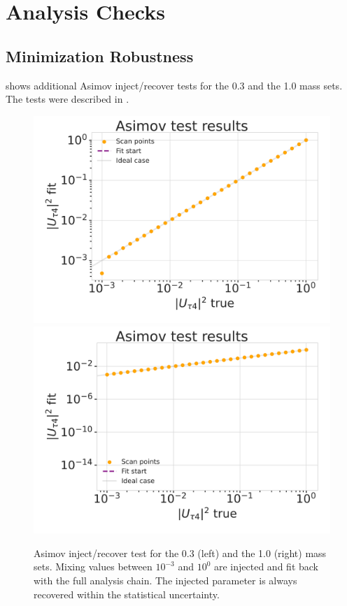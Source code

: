 \chapter{Analysis Checks}


\section{Minimization Robustness} 

 shows additional Asimov inject/recover tests for the \SI{0.3}{\gev} and the \SI{1.0}{\gev} mass sets. The tests were described in .

\begin{figure}[h]
    \includegraphics[width=0.49\linewidth]{figures/results/checks/asimov_scan_0.3_GeV-01.png}
    \includegraphics[width=0.49\linewidth]{figures/results/checks/asimov_scan_1.0_GeV-01.png}
	\caption[Asimov inject/recover test (\SI{0.3}{\gev}, \SI{1.0}{\gev})]{Asimov inject/recover test for the \SI{0.3}{\gev} (left) and the \SI{1.0}{\gev} (right) mass sets. Mixing values between $10^{-3}$ and $10^{0}$ are injected and fit back with the full analysis chain. The injected parameter is always recovered within the statistical uncertainty.}
\end{figure}



